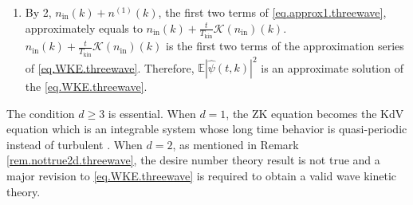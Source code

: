 \begin{thm}
\begin{enumerate}
\begin{equation}
\begin{aligned}
            && \text{if } |k|\le \epsilon_1 l_{d}^{-1},
            \\
            &0, && \text{if } |k|\ge 2C_{2}  l_{d}^{-1}
        \end{aligned}\right.
    \end{equation}%
    and 
    \begin{equation}\label{eq.n(j)estimate.threewave}
        n^{(j)}(k)=O_{\ell^\infty_k}\left(L^{-\theta}\frac{t}{T_{\mathrm {kin}}}\right), \qquad j>1
    \end{equation}
    where $\mathcal K$ is defined in \eqref{eq.WKE.threewave}, and $O_{\ell^\infty_k}(A)$ (resp. $\widetilde{O}_{\ell^\infty_k}(A)$) is a quantity that is bounded by $A$ in $\ell^\infty_k$ by some universal constant (resp. constant just depending on $d$). The definition of universal constant can be found in section \ref{sec.notat}. The definition of $\text{Err}_D$ is 
    \begin{equation}
        \text{Err}_{D}(k_x)=\left\{\begin{aligned}
             &D^{d+1}, && \text{if } |k_x|\le D,
            \\
            &D^{d-1}(|k_x|^2+D|k_x|), && \text{if } |k_x|\ge D.
        \end{aligned}
        \right.
    \end{equation}
    \item By 2, $n_{\mathrm{in}}(k)+n^{(1)}(k)$, the first two terms of \eqref{eq.approx1.threewave}, approximately equals to $n_{\mathrm{in}}(k)+\frac{t}{T_{\mathrm{kin}}}\mathcal K(n_{\mathrm{in}})(k)$. $n_{\mathrm{in}}(k)+\frac{t}{T_{\mathrm{kin}}}\mathcal K(n_{\mathrm{in}})(k)$ is the first two terms of the approximation series of \eqref{eq.WKE.threewave}. Therefore, $\mathbb E |\widehat \psi(t, k)|^2$ is an approximate solution of the \eqref{eq.WKE.threewave}.
\end{enumerate}


\end{thm}

\begin{rem}
The condition $d\ge 3$ is essential. When $d=1$, the ZK equation becomes the KdV equation which is an integrable system whose long time behavior is quasi-periodic instead of turbulent \cite{jin2021cancellations}. When $d=2$, as mentioned in Remark \ref{rem.nottrue2d.threewave}, the desire number theory result is not true and a major revision to \eqref{eq.WKE.threewave} is required to obtain a valid wave kinetic theory.
\end{rem}


